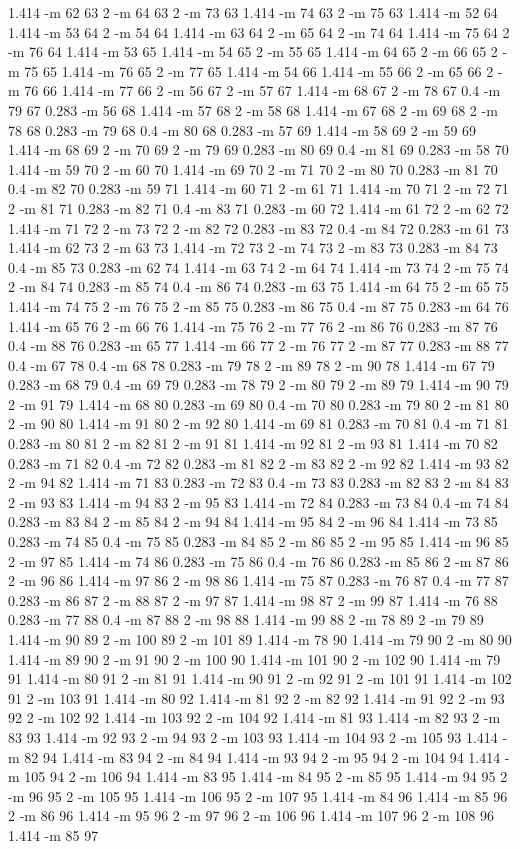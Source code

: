 \documentclass[12pt]{article}
\begin{document}
1.414 -m 62 63 2 -m 64 63 2 -m 73 63 1.414 -m 74 63 2 -m 75 63 1.414 -m 52 64 1.414 -m 53 64 2 -m 54 64 1.414 -m 63 64 2 -m 65 64 2 -m 74 64 1.414 -m 75 64 2 -m 76 64 1.414 -m 53 65 1.414 -m 54 65 2 -m 55 65 1.414 -m 64 65 2 -m 66 65 2 -m 75 65 1.414 -m 76 65 2 -m 77 65 1.414 -m 54 66 1.414 -m 55 66 2 -m 65 66 2 -m 76 66 1.414 -m 77 66 2 -m 56 67 2 -m 57 67 1.414 -m 68 67 2 -m 78 67 0.4 -m 79 67 0.283 -m 56 68 1.414 -m 57 68 2 -m 58 68 1.414 -m 67 68 2 -m 69 68 2 -m 78 68 0.283 -m 79 68 0.4 -m 80 68 0.283 -m 57 69 1.414 -m 58 69 2 -m 59 69 1.414 -m 68 69 2 -m 70 69 2 -m 79 69 0.283 -m 80 69 0.4 -m 81 69 0.283 -m 58 70 1.414 -m 59 70 2 -m 60 70 1.414 -m 69 70 2 -m 71 70 2 -m 80 70 0.283 -m 81 70 0.4 -m 82 70 0.283 -m 59 71 1.414 -m 60 71 2 -m 61 71 1.414 -m 70 71 2 -m 72 71 2 -m 81 71 0.283 -m 82 71 0.4 -m 83 71 0.283 -m 60 72 1.414 -m 61 72 2 -m 62 72 1.414 -m 71 72 2 -m 73 72 2 -m 82 72 0.283 -m 83 72 0.4 -m 84 72 0.283 -m 61 73 1.414 -m 62 73 2 -m 63 73 1.414 -m 72 73 2 -m 74 73 2 -m 83 73 0.283 -m 84 73 0.4 -m 85 73 0.283 -m 62 74 1.414 -m 63 74 2 -m 64 74 1.414 -m 73 74 2 -m 75 74 2 -m 84 74 0.283 -m 85 74 0.4 -m 86 74 0.283 -m 63 75 1.414 -m 64 75 2 -m 65 75 1.414 -m 74 75 2 -m 76 75 2 -m 85 75 0.283 -m 86 75 0.4 -m 87 75 0.283 -m 64 76 1.414 -m 65 76 2 -m 66 76 1.414 -m 75 76 2 -m 77 76 2 -m 86 76 0.283 -m 87 76 0.4 -m 88 76 0.283 -m 65 77 1.414 -m 66 77 2 -m 76 77 2 -m 87 77 0.283 -m 88 77 0.4 -m 67 78 0.4 -m 68 78 0.283 -m 79 78 2 -m 89 78 2 -m 90 78 1.414 -m 67 79 0.283 -m 68 79 0.4 -m 69 79 0.283 -m 78 79 2 -m 80 79 2 -m 89 79 1.414 -m 90 79 2 -m 91 79 1.414 -m 68 80 0.283 -m 69 80 0.4 -m 70 80 0.283 -m 79 80 2 -m 81 80 2 -m 90 80 1.414 -m 91 80 2 -m 92 80 1.414 -m 69 81 0.283 -m 70 81 0.4 -m 71 81 0.283 -m 80 81 2 -m 82 81 2 -m 91 81 1.414 -m 92 81 2 -m 93 81 1.414 -m 70 82 0.283 -m 71 82 0.4 -m 72 82 0.283 -m 81 82 2 -m 83 82 2 -m 92 82 1.414 -m 93 82 2 -m 94 82 1.414 -m 71 83 0.283 -m 72 83 0.4 -m 73 83 0.283 -m 82 83 2 -m 84 83 2 -m 93 83 1.414 -m 94 83 2 -m 95 83 1.414 -m 72 84 0.283 -m 73 84 0.4 -m 74 84 0.283 -m 83 84 2 -m 85 84 2 -m 94 84 1.414 -m 95 84 2 -m 96 84 1.414 -m 73 85 0.283 -m 74 85 0.4 -m 75 85 0.283 -m 84 85 2 -m 86 85 2 -m 95 85 1.414 -m 96 85 2 -m 97 85 1.414 -m 74 86 0.283 -m 75 86 0.4 -m 76 86 0.283 -m 85 86 2 -m 87 86 2 -m 96 86 1.414 -m 97 86 2 -m 98 86 1.414 -m 75 87 0.283 -m 76 87 0.4 -m 77 87 0.283 -m 86 87 2 -m 88 87 2 -m 97 87 1.414 -m 98 87 2 -m 99 87 1.414 -m 76 88 0.283 -m 77 88 0.4 -m 87 88 2 -m 98 88 1.414 -m 99 88 2 -m 78 89 2 -m 79 89 1.414 -m 90 89 2 -m 100 89 2 -m 101 89 1.414 -m 78 90 1.414 -m 79 90 2 -m 80 90 1.414 -m 89 90 2 -m 91 90 2 -m 100 90 1.414 -m 101 90 2 -m 102 90 1.414 -m 79 91 1.414 -m 80 91 2 -m 81 91 1.414 -m 90 91 2 -m 92 91 2 -m 101 91 1.414 -m 102 91 2 -m 103 91 1.414 -m 80 92 1.414 -m 81 92 2 -m 82 92 1.414 -m 91 92 2 -m 93 92 2 -m 102 92 1.414 -m 103 92 2 -m 104 92 1.414 -m 81 93 1.414 -m 82 93 2 -m 83 93 1.414 -m 92 93 2 -m 94 93 2 -m 103 93 1.414 -m 104 93 2 -m 105 93 1.414 -m 82 94 1.414 -m 83 94 2 -m 84 94 1.414 -m 93 94 2 -m 95 94 2 -m 104 94 1.414 -m 105 94 2 -m 106 94 1.414 -m 83 95 1.414 -m 84 95 2 -m 85 95 1.414 -m 94 95 2 -m 96 95 2 -m 105 95 1.414 -m 106 95 2 -m 107 95 1.414 -m 84 96 1.414 -m 85 96 2 -m 86 96 1.414 -m 95 96 2 -m 97 96 2 -m 106 96 1.414 -m 107 96 2 -m 108 96 1.414 -m 85 97 
\end{document}
